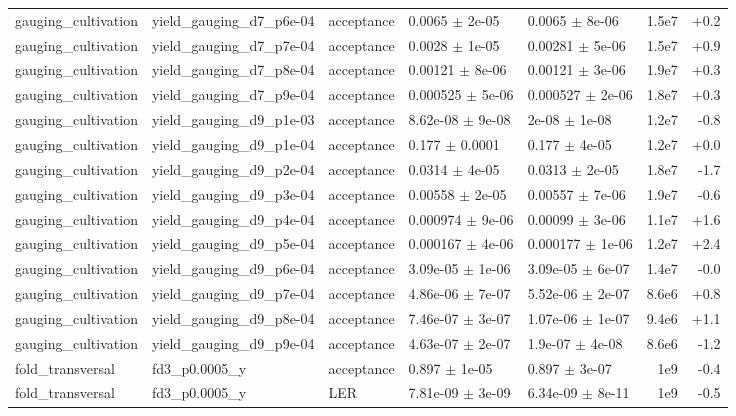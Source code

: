 \documentclass[10pt]{article}
\begin{document}
{\begin{longtable}{l l l l l r r}
gauging\_cultivation & yield\_gauging\_d7\_p6e-04 & acceptance & 0.0065 $\pm$ 2e-05 & 0.0065 $\pm$ 8e-06 & 1.5e7 & +0.2 \\
gauging\_cultivation & yield\_gauging\_d7\_p7e-04 & acceptance & 0.0028 $\pm$ 1e-05 & 0.00281 $\pm$ 5e-06 & 1.5e7 & +0.9 \\
gauging\_cultivation & yield\_gauging\_d7\_p8e-04 & acceptance & 0.00121 $\pm$ 8e-06 & 0.00121 $\pm$ 3e-06 & 1.9e7 & +0.3 \\
gauging\_cultivation & yield\_gauging\_d7\_p9e-04 & acceptance & 0.000525 $\pm$ 5e-06 & 0.000527 $\pm$ 2e-06 & 1.8e7 & +0.3 \\
gauging\_cultivation & yield\_gauging\_d9\_p1e-03 & acceptance & 8.62e-08 $\pm$ 9e-08 & 2e-08 $\pm$ 1e-08 & 1.2e7 & -0.8 \\
gauging\_cultivation & yield\_gauging\_d9\_p1e-04 & acceptance & 0.177 $\pm$ 0.0001 & 0.177 $\pm$ 4e-05 & 1.2e7 & +0.0 \\
gauging\_cultivation & yield\_gauging\_d9\_p2e-04 & acceptance & 0.0314 $\pm$ 4e-05 & 0.0313 $\pm$ 2e-05 & 1.8e7 & -1.7 \\
gauging\_cultivation & yield\_gauging\_d9\_p3e-04 & acceptance & 0.00558 $\pm$ 2e-05 & 0.00557 $\pm$ 7e-06 & 1.9e7 & -0.6 \\
gauging\_cultivation & yield\_gauging\_d9\_p4e-04 & acceptance & 0.000974 $\pm$ 9e-06 & 0.00099 $\pm$ 3e-06 & 1.1e7 & +1.6 \\
gauging\_cultivation & yield\_gauging\_d9\_p5e-04 & acceptance & 0.000167 $\pm$ 4e-06 & 0.000177 $\pm$ 1e-06 & 1.2e7 & +2.4 \\
gauging\_cultivation & yield\_gauging\_d9\_p6e-04 & acceptance & 3.09e-05 $\pm$ 1e-06 & 3.09e-05 $\pm$ 6e-07 & 1.4e7 & -0.0 \\
gauging\_cultivation & yield\_gauging\_d9\_p7e-04 & acceptance & 4.86e-06 $\pm$ 7e-07 & 5.52e-06 $\pm$ 2e-07 & 8.6e6 & +0.8 \\
gauging\_cultivation & yield\_gauging\_d9\_p8e-04 & acceptance & 7.46e-07 $\pm$ 3e-07 & 1.07e-06 $\pm$ 1e-07 & 9.4e6 & +1.1 \\
gauging\_cultivation & yield\_gauging\_d9\_p9e-04 & acceptance & 4.63e-07 $\pm$ 2e-07 & 1.9e-07 $\pm$ 4e-08 & 8.6e6 & -1.2 \\
fold\_transversal & fd3\_p0.0005\_y & acceptance & 0.897 $\pm$ 1e-05 & 0.897 $\pm$ 3e-07 & 1e9 & -0.4 \\
fold\_transversal & fd3\_p0.0005\_y & LER & 7.81e-09 $\pm$ 3e-09 & 6.34e-09 $\pm$ 8e-11 & 1e9 & -0.5 \\

\end{longtable}}
\end{document}
